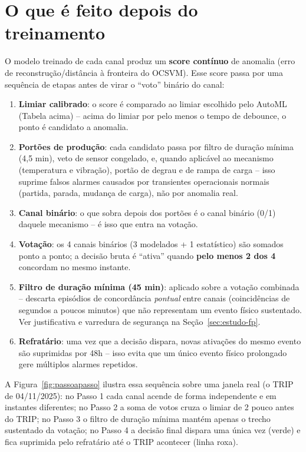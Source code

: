 \documentclass[11pt,a4paper]{article}
\begin{document}
\section{O que é feito depois do treinamento}

O modelo treinado de cada canal produz um \textbf{score contínuo} de
anomalia (erro de reconstrução/distância à fronteira do OCSVM).
Esse score passa por uma sequência de etapas antes de virar o
``voto'' binário do canal:

\begin{enumerate}
  \item \textbf{Limiar calibrado}: o score é comparado ao limiar
    escolhido pelo AutoML (Tabela acima) -- acima do limiar por pelo
    menos o tempo de debounce, o ponto é candidato a anomalia.
  \item \textbf{Portões de produção}: cada candidato passa por filtro
    de duração mínima (4,5 min), veto de sensor congelado, e, quando
    aplicável ao mecanismo (temperatura e vibração), portão de
    degrau e de rampa de carga -- isso suprime falsos alarmes
    causados por transientes operacionais normais (partida, parada,
    mudança de carga), não por anomalia real.
  \item \textbf{Canal binário}: o que sobra depois dos portões é o
    canal binário (0/1) daquele mecanismo -- é isso que entra na
    votação.
  \item \textbf{Votação}: os 4 canais binários (3 modelados + 1
    estatístico) são somados ponto a ponto; a decisão bruta é
    ``ativa'' quando \textbf{pelo menos 2 dos 4} concordam no mesmo
    instante.
  \item \textbf{Filtro de duração mínima (45 min)}: aplicado sobre a
    votação combinada -- descarta episódios de concordância
    \emph{pontual} entre canais (coincidências de segundos a poucos
    minutos) que não representam um evento físico sustentado. Ver
    justificativa e varredura de segurança na
    Seção~\ref{sec:estudo-fp}.
  \item \textbf{Refratário}: uma vez que a decisão dispara, novas
    ativações do mesmo evento são suprimidas por 48h -- isso evita
    que um único evento físico prolongado gere múltiplos alarmes
    repetidos.
\end{enumerate}

A Figura~\ref{fig:passoapasso} ilustra essa sequência sobre uma
janela real (o TRIP de 04/11/2025): no Passo 1 cada canal acende de
forma independente e em instantes diferentes; no Passo 2 a soma de
votos cruza o limiar de 2 pouco antes do TRIP; no Passo 3 o filtro de
duração mínima mantém apenas o trecho sustentado da votação; no Passo
4 a decisão final dispara uma única vez (verde) e fica suprimida pelo
refratário até o TRIP acontecer (linha roxa).
\end{document}
